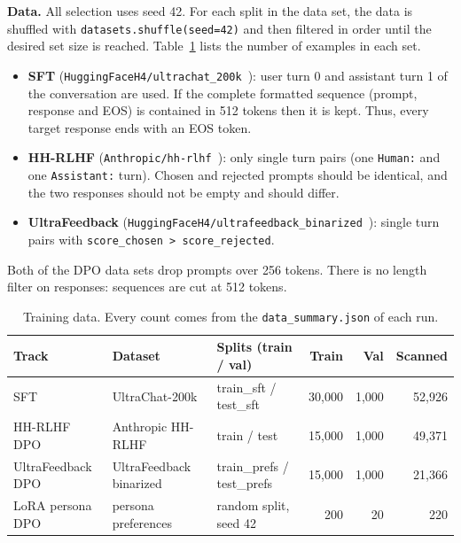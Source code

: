 \documentclass[10pt]{article}
\begin{document}
\textbf{Data.} All selection uses seed 42. For each split in the data set, the data is shuffled with \texttt{datasets.shuffle(seed=42)} and then filtered in order until the desired set size is reached. Table~\ref{tab:data} lists the number of examples in each set.
\begin{itemize}
\item \textbf{SFT} (\texttt{HuggingFaceH4/ultrachat\_200k}~\cite{ultrachat}): user turn 0 and assistant turn 1 of the conversation are used. If the complete formatted sequence (prompt, response and EOS) is contained in 512 tokens then it is kept. Thus, every target response ends with an EOS token.
\item \textbf{HH-RLHF} (\texttt{Anthropic/hh-rlhf}~\cite{hh}): only single turn pairs (one \texttt{Human:} and one \texttt{Assistant:} turn). Chosen and rejected prompts should be identical, and the two responses should not be empty and should differ.
\item \textbf{UltraFeedback} (\texttt{HuggingFaceH4/ultrafeedback\_binarized}~\cite{uf}): single turn pairs with \texttt{score\_chosen > score\_rejected}.
\end{itemize}
Both of the DPO data sets drop prompts over 256 tokens. There is no length filter on responses: sequences are cut at 512 tokens.

\begin{table}[H]
\centering\small
\caption{Training data. Every count comes from the \texttt{data\_summary.json} of each run.}
\label{tab:data}
\begin{tabular}{lllrrr}
\toprule
\textbf{Track} & \textbf{Dataset} & \textbf{Splits (train / val)} & \textbf{Train} & \textbf{Val} & \textbf{Scanned} \\
\midrule
SFT & UltraChat-200k & train\_sft / test\_sft & 30{,}000 & 1{,}000 & 52{,}926 \\
HH-RLHF DPO & Anthropic HH-RLHF & train / test & 15{,}000 & 1{,}000 & 49{,}371 \\
UltraFeedback DPO & UltraFeedback binarized & train\_prefs / test\_prefs & 15{,}000 & 1{,}000 & 21{,}366 \\
LoRA persona DPO & persona preferences & random split, seed 42 & 200 & 20 & 220 \\
\bottomrule
\end{tabular}
\end{table}
\end{document}
